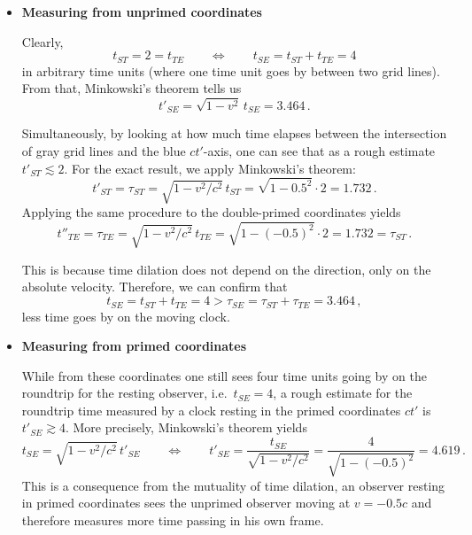 \documentclass[../relativity_main.tex]{subfiles}
\begin{document}
\begin{ex}
	\begin{itemize}
		\item \textbf{Measuring from unprimed coordinates}
		
		Clearly,
		\begin{equation*}
			t_{ST} = 2 = t_{TE}
			\qquad \Leftrightarrow \qquad
			t_{SE} = t_{ST} + t_{TE} = 4
		\end{equation*}
		in arbitrary time units (where one time unit goes by between two grid lines). From that, Minkowski's theorem tells us
		\begin{equation*}
			t'_{SE} = \sqrt{1 - v^2} \, t_{SE} = 3.464 \, .
		\end{equation*}
	
		Simultaneously, by looking at how much time elapses between the intersection of gray grid lines and the blue $ct'$-axis, one can see that as a rough estimate $t'_{ST} \lesssim 2$. For the exact result, we apply Minkowski's theorem:
		\begin{equation*}
			t'_{ST} = \tau_{ST} = \sqrt{1 - v^2 / c^2} \, t_{ST} = \sqrt{1 - 0.5^2} \cdot 2 = 1.732 \, .
		\end{equation*}
		Applying the same procedure to the double-primed coordinates yields
		\begin{equation*}
			t''_{TE} = \tau_{TE} = \sqrt{1 - v^2 / c^2} \, t_{TE} = \sqrt{1 - (-0.5)^2} \cdot 2 = 1.732 = \tau_{ST} \, .
		\end{equation*}
		
		This is because time dilation does not depend on the direction, only on the absolute velocity. Therefore, we can confirm that
		\begin{equation*}
			t_{SE} = t_{ST} + t_{TE} = 4 > \tau_{SE} = \tau_{ST} + \tau_{TE} = 3.464 \, ,
		\end{equation*}
		less time goes by on the moving clock.\\
		
	
	
		\item \textbf{Measuring from primed coordinates}
	
		While from these coordinates one still sees four time units going by on the roundtrip for the resting observer, i.e.~$t_{SE} = 4$, a rough estimate for the roundtrip time measured by a clock resting in the primed coordinates $ct'$ is $t'_{SE} \gtrsim 4$. More precisely, Minkowski's theorem yields
		\begin{equation*}
			t_{SE} = \sqrt{1 - v^2 / c^2} \, t'_{SE}
			\qquad \Leftrightarrow \qquad
			t'_{SE} = \frac{t_{SE}}{\sqrt{1 - v^2 / c^2}} = \frac{4}{\sqrt{1 - (-0.5)^2}} = 4.619 \, .
		\end{equation*}
		This is a consequence from the mutuality of time dilation, an observer resting in primed coordinates sees the unprimed observer moving at $v = -0.5 c$ and therefore measures more time passing in his own frame.
	

\end{itemize}
\end{ex}
\end{document}
